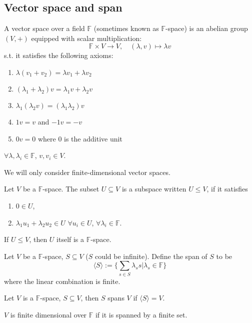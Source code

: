 \documentclass[a4paper]{article}
\begin{document}
\subsection{Vector space and span}
\begin{defi}
A vector space over a field $\mathbb{F}$ (sometimes known as $\mathbb{F}$-space) is an abelian group $(V,+)$ equipped with scalar multiplication:
$$\mathbb{F}\times V\rightarrow V,\quad(\lambda,v)\mapsto\lambda v$$
s.t. it satisfies the following axioms:
\begin{enumerate}
    \item $\lambda(v_1+v_2)=\lambda v_1+\lambda v_2$
    \item $(\lambda_1+\lambda_2)v=\lambda_1v+\lambda_2v$
    \item $\lambda_1(\lambda_2v)=(\lambda_1\lambda_2)v$
    \item $1v=v$ and $-1v=-v$
    \item $0v=0$ where 0 is the additive unit
\end{enumerate}
$\forall\lambda,\lambda_i\in\mathbb{F}$, $v,v_i\in V$.
\end{defi}
We will only consider finite-dimensional vector spaces.
\begin{defi}[Subspace]
Let $V$ be a $\mathbb{F}$-space. The subset $U\subseteq V$ is a subspace written $U\leq V$, if it satisfies
\begin{enumerate}
    \item $0\in U$,
    \item $\lambda_1u_1+\lambda_2u_2\in U$ $\forall u_i\in U$, $\forall\lambda_i\in\mathbb{F}$.
\end{enumerate}
If $U\leq V$, then $U$ itself is a $\mathbb{F}$-space.
\end{defi}
\begin{defi}
Let $V$ be a $\mathbb{F}$-space, $S\subseteq V$ ($S$ could be infinite). Define the span of $S$ to be
\begin{equation}
\langle S\rangle:=\bigg\{\sum_{s\in S}\lambda_ss|\lambda_s\in\mathbb{F}\bigg\}\tag{5.1}
\end{equation}
where the linear combination is finite.
\end{defi}
\begin{defi}[Span]
Let $V$ is a $\mathbb{F}$-space, $S\subseteq V$, then $S$ spans $V$ if $\langle S\rangle=V$.
\end{defi}
\begin{defi}
$V$ is finite dimensional over $\mathbb{F}$ if it is spanned by a finite set.
\end{defi}
\end{document}
